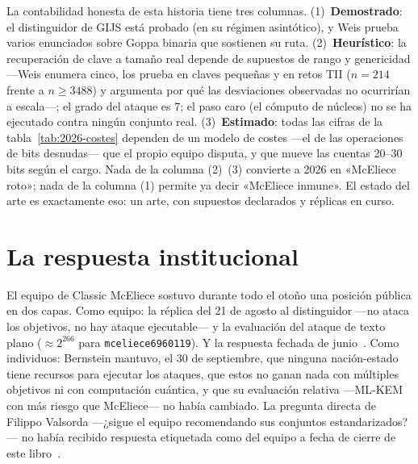 \begin{rigor}
La contabilidad honesta de esta historia tiene tres columnas.
(1)~\textbf{Demostrado}: el distinguidor de GIJS está probado (en
su régimen asintótico), y Weis prueba varios enunciados sobre
Goppa binaria que sostienen su ruta. (2)~\textbf{Heurístico}: la
recuperación de clave a tamaño real depende de supuestos de rango
y genericidad ---Weis enumera cinco, los prueba en claves pequeñas
y en retos TII ($n=214$ frente a $n\ge3488$) y argumenta por qué
las desviaciones observadas no ocurrirían a escala---; el grado
del ataque es 7; el paso caro (el cómputo de núcleos) no se ha
ejecutado contra ningún conjunto real. (3)~\textbf{Estimado}: todas
las cifras de la tabla~\ref{tab:2026-costes} dependen de un modelo
de costes ---el de las operaciones de bits desnudas--- que el
propio equipo disputa, y que mueve las cuentas 20--30 bits según
el cargo. Nada de la columna (2)~(3) convierte a 2026 en «McEliece
roto»; nada de la columna (1) permite ya decir «McEliece inmune».
El estado del arte es exactamente eso: un arte, con supuestos
declarados y réplicas en curso.
\end{rigor}

\section{La respuesta institucional}\label{sec:2026-institucional}

El equipo de Classic McEliece sostuvo durante todo el otoño una
posición pública en dos capas. Como equipo: la réplica del 21 de
agosto al distinguidor ---no ataca los objetivos, no hay ataque
ejecutable--- y la evaluación del ataque de texto plano
($\approx 2^{266}$ para \texttt{mceliece6960119}). Y la respuesta
fechada de junio~\cite{cm610}. Como individuos: Bernstein mantuvo,
el 30 de septiembre, que ninguna nación-estado tiene recursos para
ejecutar los ataques, que estos no ganan nada con múltiples
objetivos ni con computación cuántica, y que su evaluación relativa
---ML-KEM con más riesgo que McEliece--- no había cambiado. La
pregunta directa de Filippo Valsorda ---¿sigue el equipo
recomendando sus conjuntos estandarizados?--- no había recibido
respuesta etiquetada como del equipo a fecha de cierre de este
libro~\cite{bernstein2026}.


